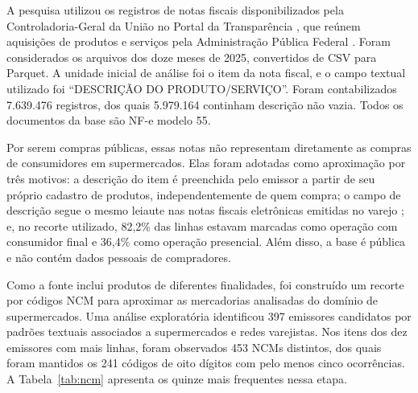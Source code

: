 \documentclass[english,brazilian]{UNISINOSmonografia}
\begin{document}
A pesquisa utilizou os registros de notas fiscais disponibilizados pela Controladoria-Geral da União no Portal da Transparência \cite{brasil2026notasfiscais}, que reúnem aquisições de produtos e serviços pela Administração Pública Federal \cite{brasil2026entendanotas}. Foram considerados os arquivos dos doze meses de 2025, convertidos de CSV para Parquet. A unidade inicial de análise foi o item da nota fiscal, e o campo textual utilizado foi ``DESCRIÇÃO DO PRODUTO/SERVIÇO''. Foram contabilizados 7.639.476 registros, dos quais 5.979.164 continham descrição não vazia. Todos os documentos da base são NF-e modelo 55.

Por serem compras públicas, essas notas não representam diretamente as compras de consumidores em supermercados. Elas foram adotadas como aproximação por três motivos: a descrição do item é preenchida pelo emissor a partir de seu próprio cadastro de produtos, independentemente de quem compra; o campo de descrição segue o mesmo leiaute nas notas fiscais eletrônicas emitidas no varejo \cite{portalnfe-moc}; e, no recorte utilizado, 82,2\% das linhas estavam marcadas como operação com consumidor final e 36,4\% como operação presencial. Além disso, a base é pública e não contém dados pessoais de compradores.

Como a fonte inclui produtos de diferentes finalidades, foi construído um recorte por códigos NCM para aproximar as mercadorias analisadas do domínio de supermercados. Uma análise exploratória identificou 397 emissores candidatos por padrões textuais associados a supermercados e redes varejistas. Nos itens dos dez emissores com mais linhas, foram observados 453 NCMs distintos, dos quais foram mantidos os 241 códigos de oito dígitos com pelo menos cinco ocorrências. A Tabela~\ref{tab:ncm} apresenta os quinze mais frequentes nessa etapa.
\end{document}
